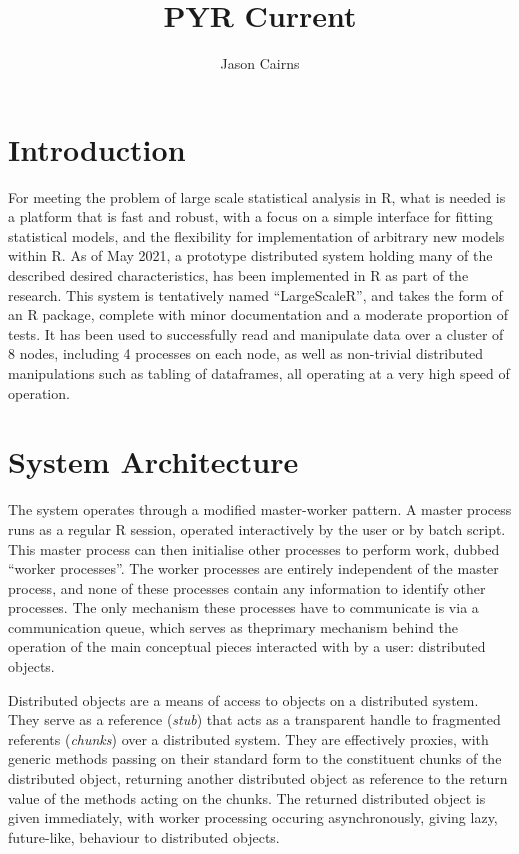 \documentclass[a4paper,10pt]{article}
\begin{document}
\title{PYR Current}
\author{Jason Cairns}
  
\maketitle{}

\section{Introduction}

For meeting the problem of large scale statistical analysis in R, what is needed is a platform that is fast and robust, with a focus on a simple interface for fitting statistical models, and the flexibility for implementation of arbitrary new models within R.
As of May 2021, a prototype distributed system holding many of the described desired characteristics, has been implemented in R as part of the research.
This system is tentatively named ``LargeScaleR'', and takes the form of an R package, complete with minor documentation and a moderate proportion of tests.
It has been used to successfully read and manipulate data over a cluster of 8 nodes, including 4 processes on each node, as well as non-trivial distributed manipulations such as tabling of dataframes, all operating at a very high speed of operation.

\section{System Architecture}\label{sec:sys-imp}

The system operates through a modified master-worker pattern.
A master process runs as a regular R session, operated interactively by the user or by batch script.
This master process can then initialise other processes to perform work, dubbed ``worker processes''.
The worker processes are entirely independent of the master process, and none of these processes contain any information to identify other processes.
The only mechanism these processes have to communicate is via a communication queue, which serves as theprimary mechanism behind the operation of the main conceptual pieces interacted with by a user: distributed objects.

Distributed objects are a means of access to objects on a distributed system.
They serve as a reference (\textit{stub}) that acts as a transparent handle to fragmented referents (\textit{chunks}) over a distributed system.
They are effectively proxies, with generic methods passing on their standard form to the constituent chunks of the distributed object, returning another distributed object as reference to the return value of the methods acting on the chunks.
The returned distributed object is given immediately, with worker processing occuring asynchronously, giving lazy, future-like, behaviour to distributed objects.
\end{document}
